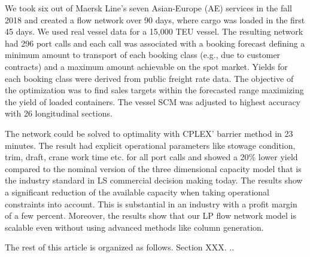 We took six out of Maersk Line's seven Asian-Europe (AE) services in the fall 2018 and created a flow network over 90 days, where cargo was loaded in the first 45 days. We used real vessel data for a 15,000 TEU vessel. The resulting network had 296 port calls and each call was associated with a booking forecast defining a minimum amount to transport of each booking class (e.g., due to customer contracts) and a maximum amount achievable on the spot market. Yields for each booking class were derived from public freight rate data. The objective of the optimization was to find sales targets within the forecasted range maximizing the yield of loaded containers. The vessel SCM was adjusted to highest accuracy with 26 longitudinal sections. 

The network could be solved to optimality with CPLEX' barrier method in 23 minutes. The result had explicit operational parameters like stowage condition, trim, draft, crane work time etc. for all port calls and showed a 20\% lower yield compared to the nominal version of the three dimensional capacity model that is the industry standard in LS commercial decision making today. The results show a significant reduction of the available capacity when taking operational constraints into account. This is substantial in an industry with a profit margin of a few percent. Moreover, the results show that our LP flow network model is scalable even without using advanced methods like column generation. 

The rest of this article is organized as follows. Section XXX. ..
